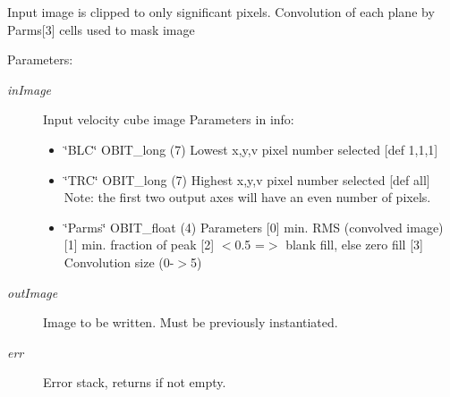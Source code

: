 Input image is clipped to only significant pixels. Convolution of each plane by Parms[3] cells used to mask image \begin{Desc}
\item[Parameters:]
\begin{description}
\item[{\em in\-Image}]Input velocity cube image Parameters in info: \begin{itemize}
\item \char`\"{}BLC\char`\"{} OBIT\_\-long (7) Lowest x,y,v pixel number selected [def 1,1,1] \item \char`\"{}TRC\char`\"{} OBIT\_\-long (7) Highest x,y,v pixel number selected [def all] Note: the first two output axes will have an even number of pixels. \item \char`\"{}Parms\char`\"{} OBIT\_\-float (4) Parameters [0] min. RMS (convolved image) [1] min. fraction of peak [2] $<$0.5 =$>$ blank fill, else zero fill [3] Convolution size (0-$>$5) \end{itemize}
\item[{\em out\-Image}]Image to be written. Must be previously instantiated. \item[{\em err}]Error stack, returns if not empty. \end{description}
\end{Desc}
